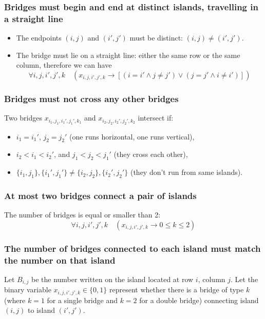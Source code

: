 \documentclass[12pt, a4paper]{article}
\begin{document}
\subsubsection{Bridges must begin and end at distinct islands, travelling in a straight line}
\begin{itemize}
    \item The endpoints $(i,j)$ and $(i',j')$ must be distinct: $(i,j) \ne (i',j')$.
    \item The bridge must lie on a straight line: either the same row or the same column, therefore we can have
    \[
    \forall i, j, i', j', k \quad \left( x_{i,j,i',j',k} \rightarrow \left[ (i = i' \land j \ne j') \lor (j = j' \land i \ne i') \right] \right)
    \]
    
\end{itemize}
\subsubsection{Bridges must not cross any other bridges}
Two bridges $x_{i_1,j_1,i_1',j_1',k_1}$ and $x_{i_2,j_2,i_2',j_2',k_2}$ intersect if:

\begin{itemize}
  \item $i_1 = i_1'$, $j_2 = j_2'$ (one runs horizontal, one runs vertical),
  \item $i_2 < i_1 < i_2'$, and $j_1 < j_2 < j_1'$ (they cross each other),
  \item $\{i_1,j_1\}, \{i_1',j_1'\} \ne \{i_2,j_2\}, \{i_2',j_2'\}$ (they don't run from same islands).
\end{itemize}
\subsubsection{At most two bridges connect a pair of islands}
The number of bridges is equal or smaller than 2:
\[
    \forall i, j, i', j', k \quad ( x_{i,j,i',j',k} \rightarrow 0 \leq k \leq 2)
    \]
\subsubsection{The number of bridges connected to each island must match the number on that island}
Let $B_{i,j}$ be the number written on the island located at row $i$, column $j$. Let the binary variable $x_{i,j,i',j',k} \in \{0,1\}$ represent whether there is a bridge of type $k$ (where $k = 1$ for a single bridge and $k = 2$ for a double bridge) connecting island $(i,j)$ to island $(i',j')$.
\end{document}
